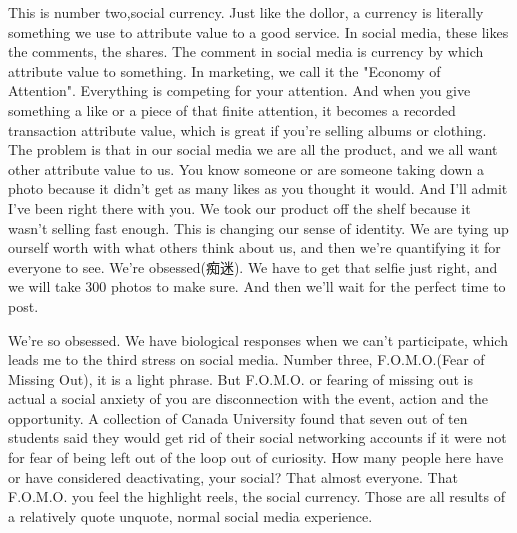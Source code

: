 \documentclass[UTF8,12pt,a4paper]{article}
\theoremstyle{Problem}
\theoremstyle{Solution}
\begin{document}
\begin{appendix}
    This is number two,social currency. Just like the dollor, a currency is literally something we use to attribute value to a good service. In social media, these likes the comments, the shares. The comment in social media is currency by which attribute value to something. In marketing, we call it the "Economy of Attention". Everything is competing for your attention. And when you give something a like or a piece of that finite attention, it becomes a recorded transaction attribute value, which is great if you're selling albums or clothing. The problem is that in our social media we are all the product, and we all want other attribute value to us.  You know someone or are someone taking down a photo because it didn't get as many likes as you thought it would. And I'll admit I've been right there with you. We took our product off the shelf because it wasn't selling fast enough. This is changing our sense of identity. We are tying up ourself worth with what others think about us, and then we're quantifying it for everyone to see. We're obsessed(痴迷). We have to get that selfie just right, and we will take 300 photos to make sure. And then we'll wait for the perfect time to post. 
    
    We're so obsessed. We have biological responses when we can't participate, which leads me to the third stress on social media. Number three, F.O.M.O.(Fear of Missing Out), it is a light phrase.   But F.O.M.O. or fearing of missing out is actual a social anxiety of you are disconnection with the event, action and the opportunity. A collection  of Canada University found that seven out of ten students said they would get rid of their social networking accounts if it were not for fear of being left out of the loop out of curiosity.  How many people here have or have considered deactivating, your social? That almost everyone. That F.O.M.O. you feel the highlight reels, the social currency. Those are all results of a relatively quote unquote, normal social media experience. 
    

\end{appendix}
\end{document}
